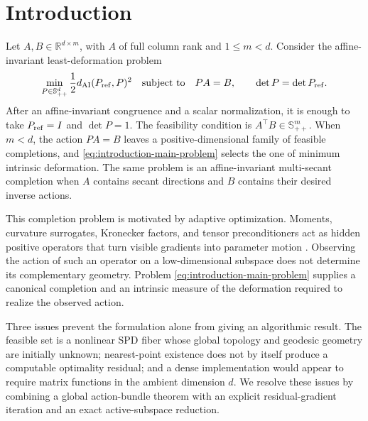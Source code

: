 \section{Introduction}
\label{sec:introduction}

Let \(A,B\in\mathbb R^{d\times m}\), with \(A\) of full column rank and
\(1\le m<d\).  Consider the affine-invariant least-deformation problem
\begin{equation}
  \min_{P\in\mathbb S_{++}^d}
  \frac12 d_{\mathrm{AI}}(P_{\rm ref},P)^2
  \quad\text{subject to}\quad
  PA=B,
  \qquad
  \det P=\det P_{\rm ref}.
  \label{eq:introduction-main-problem}
\end{equation}
After an affine-invariant congruence and a scalar normalization, it is enough
to take \(P_{\rm ref}=I\) and \(\det P=1\).  The feasibility condition is
\(A^\top B\in\mathbb S_{++}^m\).  When \(m<d\), the action \(PA=B\) leaves a
positive-dimensional family of feasible completions, and
\cref{eq:introduction-main-problem} selects the one of minimum intrinsic
deformation.  The same problem is an affine-invariant multi-secant completion
when \(A\) contains secant directions and \(B\) contains their desired inverse
actions.

This completion problem is motivated by adaptive optimization.  Moments,
curvature surrogates, Kronecker factors, and tensor preconditioners act as
hidden positive operators that turn visible gradients into parameter motion
\cite{duchi2011adagrad,kingma2014adam,martens2015kfac,
gupta2018shampoo,morwani2024shampoo,jordan2024muon,
essentialai2025muon,crawshaw2025muonvariants}.  Observing the action of such an
operator on a low-dimensional subspace does not determine its complementary
geometry.  Problem \eqref{eq:introduction-main-problem} supplies a canonical
completion and an intrinsic measure of the deformation required to realize
the observed action.

Three issues prevent the formulation alone from giving an algorithmic result.
The feasible set is a nonlinear SPD fiber whose global topology and geodesic
geometry are initially unknown; nearest-point existence does not by itself
produce a computable optimality residual; and a dense implementation would
appear to require matrix functions in the ambient dimension \(d\).  We resolve
these issues by combining a global action-bundle theorem with an explicit
residual-gradient iteration and an exact active-subspace reduction.


